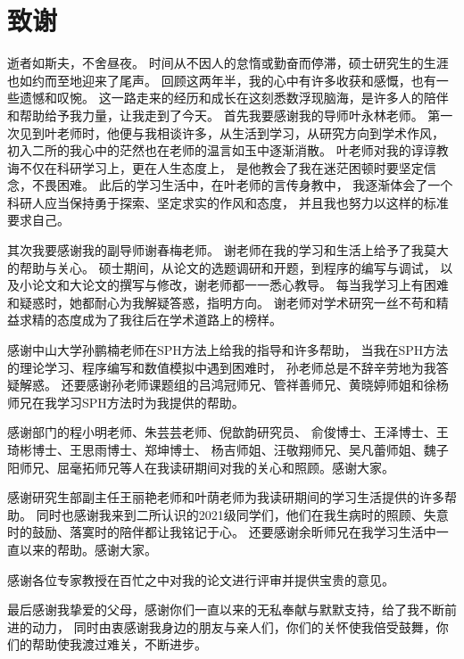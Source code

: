 \section*{致谢}
\label{sec:acknowledgements}

逝者如斯夫，不舍昼夜。
时间从不因人的怠惰或勤奋而停滞，硕士研究生的生涯也如约而至地迎来了尾声。
回顾这两年半，我的心中有许多收获和感慨，也有一些遗憾和叹惋。
这一路走来的经历和成长在这刻悉数浮现脑海，是许多人的陪伴和帮助给予我力量，让我走到了今天。
首先我要感谢我的导师叶永林老师。
第一次见到叶老师时，他便与我相谈许多，从生活到学习，从研究方向到学术作风，
初入二所的我心中的茫然也在老师的温言如玉中逐渐消散。
叶老师对我的谆谆教诲不仅在科研学习上，更在人生态度上，
是他教会了我在迷茫困顿时要坚定信念，不畏困难。
此后的学习生活中，在叶老师的言传身教中，
我逐渐体会了一个科研人应当保持勇于探索、坚定求实的作风和态度，
并且我也努力以这样的标准要求自己。

其次我要感谢我的副导师谢春梅老师。
谢老师在我的学习和生活上给予了我莫大的帮助与关心。
硕士期间，从论文的选题调研和开题，到程序的编写与调试，
以及小论文和大论文的撰写与修改，谢老师都一一悉心教导。
每当我学习上有困难和疑惑时，她都耐心为我解疑答惑，指明方向。
谢老师对学术研究一丝不苟和精益求精的态度成为了我往后在学术道路上的榜样。

感谢中山大学孙鹏楠老师在SPH方法上给我的指导和许多帮助，
当我在SPH方法的理论学习、程序编写和数值模拟中遇到困难时，
孙老师总是不辞辛劳地为我答疑解惑。
还要感谢孙老师课题组的吕鸿冠师兄、管祥善师兄、黄晓婷师姐和徐杨师兄在我学习SPH方法时为我提供的帮助。

感谢部门的程小明老师、朱芸芸老师、倪歆韵研究员、
俞俊博士、王泽博士、王琦彬博士、王思雨博士、郑坤博士、
杨吉师姐、汪敬翔师兄、吴凡蕾师姐、魏子阳师兄、屈毫拓师兄等人在我读研期间对我的关心和照顾。感谢大家。

感谢研究生部副主任王丽艳老师和叶荫老师为我读研期间的学习生活提供的许多帮助。
同时也感谢我来到二所认识的2021级同学们，他们在我生病时的照顾、失意时的鼓励、落寞时的陪伴都让我铭记于心。
还要感谢余昕师兄在我学习生活中一直以来的帮助。感谢大家。

感谢各位专家教授在百忙之中对我的论文进行评审并提供宝贵的意见。

最后感谢我挚爱的父母，感谢你们一直以来的无私奉献与默默支持，给了我不断前进的动力，
同时由衷感谢我身边的朋友与亲人们，你们的关怀使我倍受鼓舞，你们的帮助使我渡过难关，不断进步。